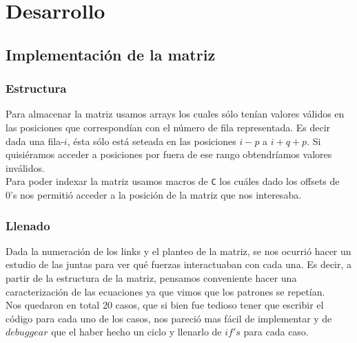 \section{Desarrollo}

\subsection{Implementación de la matriz}

\subsubsection{Estructura}

Para almacenar la matriz usamos arrays los cuales sólo tenían valores válidos en las posiciones que correspondían con el número de fila representada. Es decir dada una fila-$i$, ésta sólo está seteada en las posiciones $i - p$ a $i + q + p$. Si quisiéramos acceder a posiciones por fuera de ese rango obtendríamos valores inválidos.\\

Para poder indexar la matriz usamos macros de \verb|C| los cuáles dado los offsets de 0's nos permitió acceder a la posición de la matriz que nos interesaba.

\subsubsection{Llenado}

Dada la numeración de los links y el planteo de la matriz, se nos ocurrió hacer un estudio de las juntas para ver qué fuerzas interactuaban con cada una. Es decir, a partir de la estructura de la matriz, pensamos conveniente hacer una caracterización de las ecuaciones ya que vimos que los patrones se repetían.\\

Nos quedaron en total 20 casos, que si bien fue tedioso tener que escribir el código para cada uno de los casos, nos pareció mas fácil de implementar y de $debuggear$ que el haber hecho un ciclo y llenarlo de $if's$ para cada caso.

